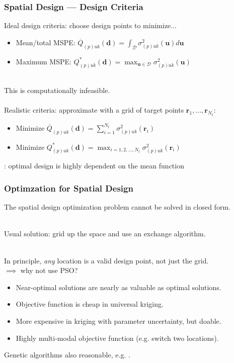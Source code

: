 \documentclass[xcolor=dvipsnames]{beamer}
\begin{document}
\begin{frame}
\frametitle{Spatial Design --- Design Criteria}
Ideal design criteria: choose design points to minimize...
\begin{itemize}
\item Mean/total MSPE: $\overline{Q}_{(p)uk}(\bm{d}) = \int_{\mathcal{D}}\sigma_{(p)uk}^2(\bm{u})d\bm{u}$
\item Maximum MSPE: $Q^*_{(p)uk}(\bm{d}) = \max_{\bm{u}\in\mathcal{D}}\sigma_{(p)uk}^2(\bm{u})$\\~\\
\end{itemize}

\pause

This is computationally infeasible. \pause \\~\\

Realistic criteria: approximate with a grid of target points $\bm{r}_1,\dots,\bm{r}_{N_t}$:
\begin{itemize}
\item Minimize $\overline{Q}_{(p)uk}(\bm{d}) = \sum_{i=1}^{N_t}\sigma_{(p)uk}^2(\bm{r}_i)$ 
\item Minimize $Q_{(p)uk}^*(\bm{d}) = \max_{i=1,2,\dots,N_t}\sigma_{(p)uk}^2(\bm{r}_i)$ \pause
\end{itemize}

\cite{zimmerman2006optimal}: optimal design is highly dependent on the mean function

\end{frame}

\begin{frame}
  \frametitle{Optimzation for Spatial Design}
  The spatial design optimization problem cannot be solved in closed form. \\~\\ \pause
  
  Usual solution: grid up the space and use an exchange algorithm. \citep{nychka1998design,wikle1999space,wikle2005dynamic} \\~\\ \pause

  In principle, \emph{any} location is a valid design point, not just the grid.\\
  $\implies$ why not use PSO? \pause \\
  \begin{itemize}
  \item Near-optimal solutions are nearly as valuable as optimal solutions.
  \item Objective function is cheap in universal kriging.
  \item More expensive in kriging with parameter uncertainty, but doable.
  \item Highly multi-modal objective function (e.g. switch two locations).\pause
  \end{itemize}

  Genetic algorithms also reasonable, e.g. \citet{hamada2001finding}.
\end{frame}
\end{document}
